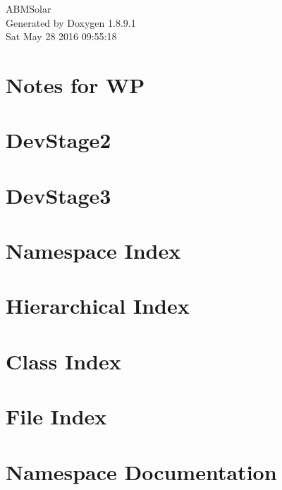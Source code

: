 \documentclass[twoside]{book}
\newcommand{\+}{\discretionary{\mbox{\scriptsize$\hookleftarrow$}}{}{}}
\newcommand{\clearemptydoublepage}{%
  \newpage{\pagestyle{empty}\cleardoublepage}%
}
\begin{document}
\hypersetup{pageanchor=false,
             bookmarks=true,
             bookmarksnumbered=true,
             pdfencoding=unicode
            }
\begin{titlepage}
\vspace*{7cm}
\begin{center}%
{\Large A\+B\+M\+Solar }\\
\vspace*{1cm}
{\large Generated by Doxygen 1.8.9.1}\\
\vspace*{0.5cm}
{\small Sat May 28 2016 09:55:18}\\
\end{center}
\end{titlepage}
\clearemptydoublepage
\tableofcontents
\clearemptydoublepage
{}
\hypersetup{pageanchor=true}

\chapter{Notes for W\+P}
\label{wp}
\hypertarget{wp}{}

\chapter{Dev\+Stage2}
\label{_dev_stage2}
\hypertarget{_dev_stage2}{}

\chapter{Dev\+Stage3}
\label{_dev_stage3}
\hypertarget{_dev_stage3}{}

\chapter{Namespace Index}

\chapter{Hierarchical Index}

\chapter{Class Index}

\chapter{File Index}

\chapter{Namespace Documentation}





\end{document}

